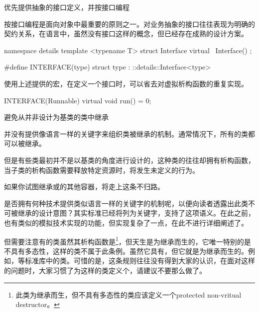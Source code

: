 \begin{content}

\begin{regulation}
优先提供抽象的接口定义，并按接口编程
\end{regulation}

按接口编程是面向对象中最重要的原则之一。对业务抽象的接口往往表现为明确的契约关系，在语言中，虽然没有接口这样的概念，但已经存在成熟的设计方案。

\begin{leftbar}
\begin{c++}
namespace details
{
   template <typename T>
   struct Interface
   {
      virtual ~Interface() {}
   };
}

#define INTERFACE(type) struct type : ::details::Interface<type>
\end{c++}
\end{leftbar}

使用上述提供的宏，在定义一个接口时，可以省去对虚拟析构函数的重复实现。

\begin{leftbar}
\begin{c++}
INTERFACE(Runnable)
{
    virtual void run() = 0;
}
\end{c++}
\end{leftbar}

\begin{regulation}
避免从并非设计为基类的类中继承
\end{regulation}

并没有提供像语言一样的关键字来组织类被继承的机制。通常情况下，所有的类都可以被继承。

但是有些类最初并不是以基类的角度进行设计的，这种类的往往却拥有析构函数，当子类的析构函数需要释放特定资源时，将发生未定义的行为。

如果你试图继承或的其他容器，将走上这条不归路。

是否拥有何种技术提供类似语言一样的关键字的机制呢，以便向读者透露出此类不可被继承的设计意图？其实标准已经将列为关键字，支持了这项语义。在此之前，也有类似的模拟技术实现的功能，但实现复杂了一点，在此不进行详细阐述了。

但需要注意有的类虽然其析构函数是\footnote{此类为继承而生，但不具有多态性的类应该定义一个protected non-vritual destructor。}，但天生是为继承而生的，它唯一特别的是不具有多态性，这样的类不属于此条例。虽然它具有，但它就是为继承而生的。例如，等标准库中的类。可惜的是，这条规则往往没有得到大家的认识，在面对这样的问题时，大家习惯了为这样的类定义个，请建议不要那么做了。


\end{content}

